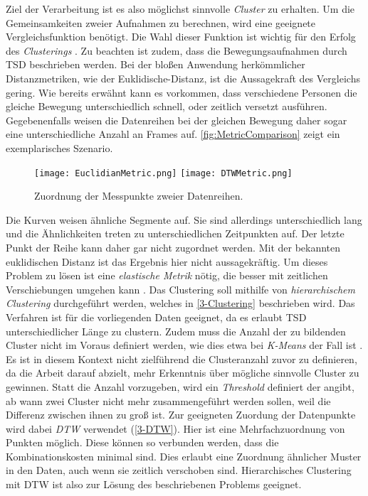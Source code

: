 Ziel der Verarbeitung ist es also möglichst sinnvolle \emph{Cluster} zu erhalten.
Um die Gemeinsamkeiten zweier Aufnahmen zu berechnen,
wird eine geeignete Vergleichsfunktion benötigt.
Die Wahl dieser Funktion ist wichtig für den Erfolg des \emph{Clusterings} \citep{warren_liao_clustering_2005}.
Zu beachten ist zudem, dass die Bewegungsaufnahmen durch \ac{TSD} beschrieben werden.
Bei der bloßen Anwendung herkömmlicher Distanzmetriken, wie der Euklidische-Distanz,
ist die Aussagekraft des Vergleichs gering.
Wie bereits erwähnt kann es vorkommen, dass verschiedene Personen die gleiche Bewegung unterschiedlich schnell,
oder zeitlich versetzt ausführen.
Gegebenenfalls weisen die Datenreihen bei der gleichen Bewegung daher sogar eine unterschiedliche Anzahl an Frames auf.
\autoref{fig:MetricComparison} zeigt ein exemplarisches Szenario.
\begin{figure}[ht]
    \begin{center}
    \texttt{[image: EuclidianMetric.png]}
    \texttt{[image: DTWMetric.png]}
    \end{center}
    \caption{Zuordnung der Messpunkte zweier Datenreihen.}
    \label{fig:MetricComparison}
\end{figure}
Die Kurven weisen ähnliche Segmente auf.
Sie sind allerdings unterschiedlich lang und die Ähnlichkeiten treten zu unterschiedlichen Zeitpunkten auf.
Der letzte Punkt der Reihe kann daher gar nicht zugordnet werden.
Mit der bekannten euklidischen Distanz ist das Ergebnis hier nicht aussagekräftig.
Um dieses Problem zu lösen ist eine \emph{elastische Metrik} nötig,
die besser mit zeitlichen Verschiebungen umgehen kann \citep{aghabozorgi_time-series_2015}.
Das Clustering soll mithilfe von \emph{hierarchischem Clustering} durchgeführt werden,
welches in \autoref{3-Clustering} beschrieben wird.
Das Verfahren ist für die vorliegenden Daten geeignet,
da es erlaubt \ac{TSD} unterschiedlicher Länge zu clustern.
Zudem muss die Anzahl der zu bildenden Cluster nicht im Voraus definiert werden,
wie dies etwa bei \emph{K-Means} der Fall ist \citep{aghabozorgi_time-series_2015}.
Es ist in diesem Kontext nicht zielführend die Clusteranzahl zuvor zu definieren,
da die Arbeit darauf abzielt, mehr Erkenntnis über mögliche sinnvolle Cluster zu gewinnen.
Statt die Anzahl vorzugeben, wird ein \emph{Threshold} definiert der angibt,
ab wann zwei Cluster nicht mehr zusammengeführt werden sollen,
weil die Differenz zwischen ihnen zu groß ist.
Zur geeigneten Zuordung der Datenpunkte wird dabei \emph{\ac{DTW}} verwendet (\autoref{3-DTW}).
Hier ist eine Mehrfachzuordnung von Punkten möglich.
Diese können so verbunden werden, dass die Kombinationskosten minimal sind.
Dies erlaubt eine Zuordnung ähnlicher Muster in den Daten, auch wenn sie zeitlich verschoben sind.
Hierarchisches Clustering mit \ac{DTW} ist also zur Lösung des beschriebenen Problems geeignet.